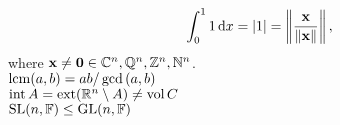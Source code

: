\documentclass[varwidth]{standalone}
\begin{document}
\[
  \int_{0}^{1} 1 \ud x = \abs{1} =
  \normlr{\frac{\vect{x}}{\norm{\vect{x}}}},
\]
where $\vect{x} \ne \zeros \in \C^n, \Q^n, \Z^n,
\N^n$.\\
$\lcm(a,b)=ab/\gcd{(a,b)}$\\
$\interior A=\exterior (\R^n \setminus A) \ne \volume C$\\
$\SL(n,\F) \le \GL(n,\F)$
\end{document}
